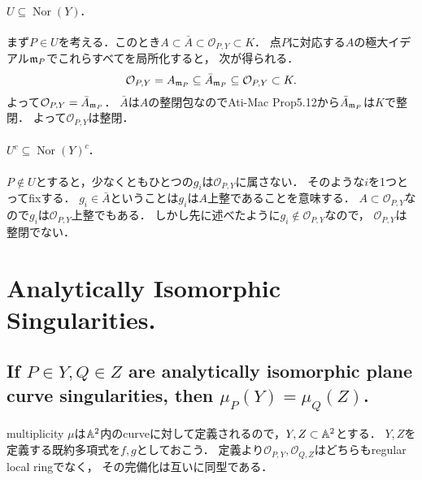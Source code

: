\documentclass[a4paper]{jsarticle}
\newcommand{\Nor}{\operatorname{Nor}}
\begin{document}
    \paragraph{$U \subseteq \Nor(Y)$.}
    まず$P \in U$を考える．このとき$A \subset \bar{A} \subset \mathcal{O}_{P,Y} \subset K$．
    点$P$に対応する$A$の極大イデアル$\mathfrak{m}_P$でこれらすべてを局所化すると，
    次が得られる．
    \[ \mathcal{O}_{P,Y}=A_{\mathfrak{m}_P} \subseteq \bar{A}_{\mathfrak{m}_P} \subseteq \mathcal{O}_{P,Y} \subset K. \]
    よって$\mathcal{O}_{P,Y}=\bar{A}_{\mathfrak{m}_P}$．
    $\bar{A}$は$A$の整閉包なのでAti-Mac Prop5.12から$\bar{A}_{\mathfrak{m}_P}$は$K$で整閉．
    よって$\mathcal{O}_{P,Y}$は整閉．

    \paragraph{$U^c \subseteq \Nor(Y)^c$.}
    $P \not \in U$とすると，少なくともひとつの$g_i$は$\mathcal{O}_{P,Y}$に属さない．
    そのような$i$を1つとってfixする．
    $g_i \in \bar{A}$ということは$g_i$は$A$上整であることを意味する．
    $A \subset \mathcal{O}_{P,Y}$なので$g_i$は$\mathcal{O}_{P,Y}$上整でもある．
    しかし先に述べたように$g_i \not \in \mathcal{O}_{P,Y}$なので，
    $\mathcal{O}_{P,Y}$は整閉でない．

\section{Analytically Isomorphic Singularities.} %
    \subsection{If $P \in Y, Q \in Z$ are analytically isomorphic plane curve singularities, then $\mu_P(Y)=\mu_Q(Z)$.}
    multiplicity $\mu$は$\mathbb{A}^2$内のcurveに対して定義されるので，$Y,Z \subset \mathbb{A}^2$とする．
    $Y,Z$を定義する既約多項式を$f,g$としておこう．
    定義より$\mathcal{O}_{P,Y}, \mathcal{O}_{Q,Z}$はどちらもregular local ringでなく，
    その完備化は互いに同型である．
\end{document}
